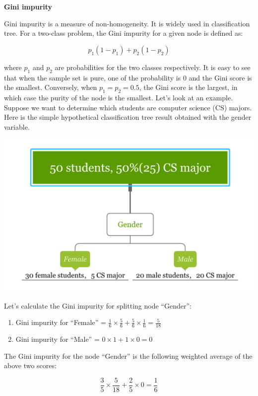 \documentclass[12pt,]{krantz}
\providecommand{\tightlist}{%
  \setlength{\itemsep}{0pt}\setlength{\parskip}{0pt}}
\theoremstyle{definition}
\theoremstyle{definition}
\theoremstyle{definition}
\theoremstyle{remark}
\begin{document}
\textbf{Gini impurity}

Gini impurity\citep{Breiman1984} is a measure of non-homogeneity. It is
widely used in classification tree. For a two-class problem, the Gini
impurity for a given node is defined as:

\[p_{1}(1-p_{1})+p_{2}(1-p_{2})\]

where \(p_{1}\) and \(p_{2}\) are probabilities for the two classes
respectively. It is easy to see that when the sample set is pure, one of
the probability is 0 and the Gini score is the smallest. Conversely,
when \(p_{1}=p_{2}=0.5\), the Gini score is the largest, in which case
the purity of the node is the smallest. Let's look at an example.
Suppose we want to determine which students are computer science (CS)
majors. Here is the simple hypothetical classification tree result
obtained with the gender variable.

\includegraphics{../linhui.org/book/Figure/giniEN.PNG}

Let's calculate the Gini impurity for splitting node ``Gender'':

\begin{enumerate}
\def\labelenumi{\arabic{enumi}.}
\tightlist
\item
  Gini impurity for ``Female'' =
  \(\frac{1}{6}\times\frac{5}{6}+\frac{5}{6}\times\frac{1}{6}=\frac{5}{18}\)
\item
  Gini impurity for ``Male'' = \(0\times1+1\times 0=0\)
\end{enumerate}

The Gini impurity for the node ``Gender'' is the following weighted
average of the above two scores:

\[\frac{3}{5}\times\frac{5}{18}+\frac{2}{5}\times 0=\frac{1}{6}\]
\end{document}
